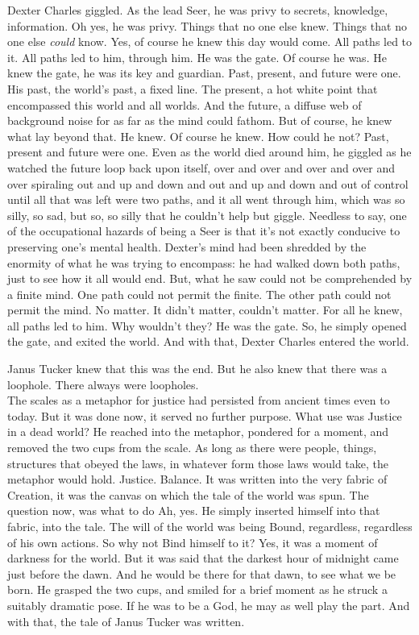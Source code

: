 Dexter Charles giggled. As the lead Seer, he was privy to secrets, knowledge, information. Oh yes, he was privy. Things that no one else knew. Things that no one else \emph{could} know. Yes, of course he knew this day would come. All paths led to it.
\SmallVSpace
All paths led to him, through him. He was the gate. Of course he was. He knew the gate, he was its key and guardian. Past, present, and future were one. His past, the world’s past, a fixed line. The present, a hot white point that encompassed this world and all worlds. And the future, a diffuse web of background noise for as far as the mind could fathom.
\SmallVSpace
But of course, he knew what lay beyond that. He knew. Of course he knew. How could he not? Past, present and future were one. Even as the world died around him, he giggled as he watched the future loop back upon itself, over and over and over and over and over spiraling out and up and down and out and up and down and out of control until all that was left were two paths, and it all went through him, which was so silly, so sad, but so, so silly that he couldn’t help but giggle.
\SmallVSpace
Needless to say, one of the occupational hazards of being a Seer is that it’s not exactly conducive to preserving one’s mental health. Dexter’s mind had been shredded by the enormity of what he was trying to encompass: he had walked down both paths, just to see how it all would end. But, what he saw could not be comprehended by a finite mind.
\SomeVSpace
One path could not permit the finite.
\SmallVSpace
The other path could not permit the mind.
\SomeVSpace
No matter. It didn’t matter, couldn’t matter. For all he knew, all paths led to him. Why wouldn’t they? He was the gate. So, he simply opened the gate, and exited the world.
\SomeVSpace
And with that, Dexter Charles entered the world.
\simpleline
{}

Janus Tucker knew that this was the end. But he also knew that there was a loophole. There always were loopholes.\\The scales as a metaphor for justice had persisted from ancient times even to today. But it was done now, it served no further purpose. What use was Justice in a dead world? He reached into the metaphor, pondered for a moment, and removed the two cups from the scale.
\SmallVSpace
As long as there were people, things, structures that obeyed the laws, in whatever form those laws would take, the metaphor would hold. Justice. Balance. It was written into the very fabric of Creation, it was the canvas on which the tale of the world was spun.
\SmallVSpace
The question now, was what to do{\el} Ah, yes. He simply inserted himself into that fabric, into the tale. The will of the world was being Bound, regardless, regardless of his own actions. So why not Bind himself to it? Yes, it was a moment of darkness for the world. But it was said that the darkest hour of midnight came just before the dawn. And he would be there for that dawn, to see what we be born.
\SmallVSpace
He grasped the two cups, and smiled for a brief moment as he struck a suitably dramatic pose. If he was to be a God, he may as well play the part.
\SomeVSpace
And with that, the tale of Janus Tucker was written.
\simpleline
{}

